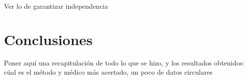 \documentclass[11pt]{book}
\begin{document}
	Ver lo de garantizar independencia 
	
	
	\chapter{Conclusiones}  %
	\doublespacing 
	Poner aquí una recapitulación de todo lo que se hizo, y los resultados obtenidos: cúal es el método y médico más acertado, un poco de datos circulares
	
	
	
	
\end{document}
